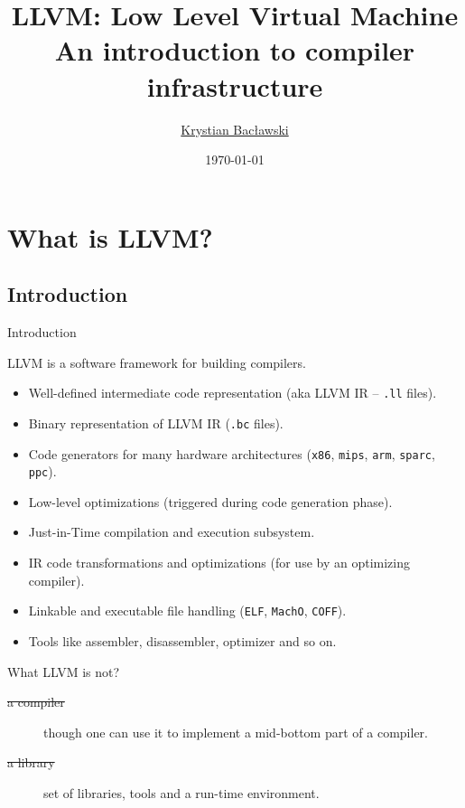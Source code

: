 \documentclass[8pt]{beamer}
\title[LLVM]{LLVM: Low Level Virtual Machine\\An introduction to compiler infrastructure}
\author[Krystian Bacławski]{\href{mailto:cahirwpz@cs.uni.wroc.pl}{Krystian Bacławski}}
\institute{Computer Science Department\\University of Wrocław}
\date{\today}
\begin{document}
\begin{frame}
\titlepage
\end{frame}

\section[Introduction]{What is LLVM?}
\subsection*{Introduction}

\begin{frame}[fragile]{Introduction}
  \begin{block}{LLVM is a software framework for building compilers.}
    \begin{itemize}
      \item Well-defined intermediate code representation (aka LLVM IR -- \verb+.ll+ files).
      \item Binary representation of LLVM IR (\verb+.bc+ files).
      \item Code generators for many hardware architectures (\verb+x86+,
        \verb+mips+, \verb+arm+, \verb+sparc+, \verb+ppc+).
      \item Low-level optimizations (triggered during code generation phase).
      \item Just-in-Time compilation and execution subsystem.
      \item IR code transformations and optimizations (for use by an optimizing compiler).
      \item Linkable and executable file handling (\verb+ELF+, \verb+MachO+, \verb+COFF+).
      \item Tools like assembler, disassembler, optimizer and so on.
    \end{itemize}
  \end{block}

  \begin{block}{What LLVM is not?}
    \begin{description}
      \item[\sout{a compiler}] though one can use it to implement a mid-bottom part of a compiler.
      \item[\sout{a library}] set of libraries, tools and a run-time environment.
    \end{description}
  \end{block}
\end{frame}
\end{document}
